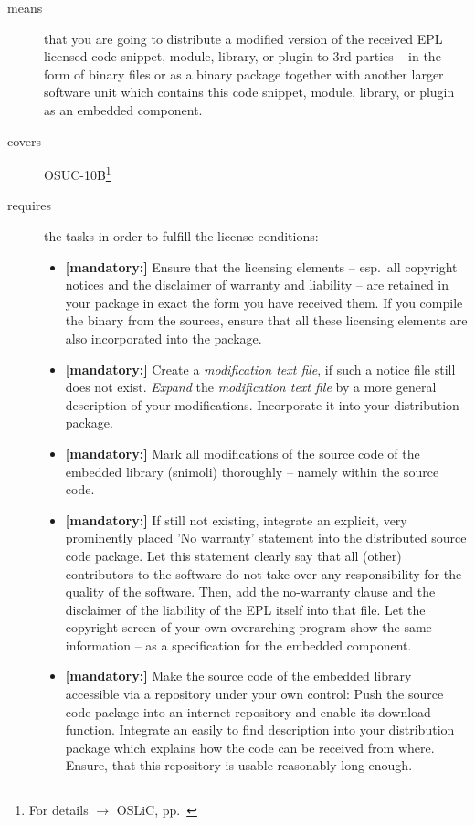 \begin{description}
\item[means] that you are going to distribute a modified version of the received
EPL licensed code snippet, module, library, or plugin to 3rd parties -- in the
form of binary files or as a binary package together with another larger
software unit which contains this code snippet, module, library, or plugin as an
embedded component.
\item[covers] OSUC-10B\footnote{For details $\rightarrow$ OSLiC, pp.\
\pageref{OSUC-10B-DEF}}
\item[requires] the tasks in order to fulfill the license conditions:
\begin{itemize}

  \item \textbf{[mandatory:]} Ensure that the licensing elements -- esp.\ all
  copyright notices and the disclaimer of warranty and liability -- are retained
  in your package in exact the form you have received them. If you compile the
  binary from the sources, ensure that all these licensing elements are also
  incorporated into the package.
  
  \item \textbf{[mandatory:]} Create a \emph{modification text file}, if such a
  notice file still does not exist. \emph{Expand} the \emph{modification text
  file} by a more general description of your modifications. Incorporate it into
  your distribution package.

  \item \textbf{[mandatory:]} Mark all modifications of the source code of the
  embedded library (snimoli) thoroughly -- namely within the source code.

  \item \textbf{[mandatory:]} If still not existing, integrate an explicit, very
  prominently placed 'No warranty' statement into the distributed source code
  package. Let this statement clearly say that all (other) contributors to the
  software do not take over any responsibility for the quality of the software.
  Then, add the no-warranty clause and the disclaimer of the liability of the
  EPL itself into that file. Let the copyright screen of your own overarching
  program show the same information  -- as a specification for the embedded
  component.
  
  \item \textbf{[mandatory:]} Make the source code of the embedded library
  accessible via a repository under your own control: Push the source code
  package into an internet repository and enable its download function.
  Integrate an easily to find description into your distribution package which
  explains how the code can be received from where. Ensure, that this repository
  is usable reasonably long enough.
  

\end{itemize}
\end{description}
